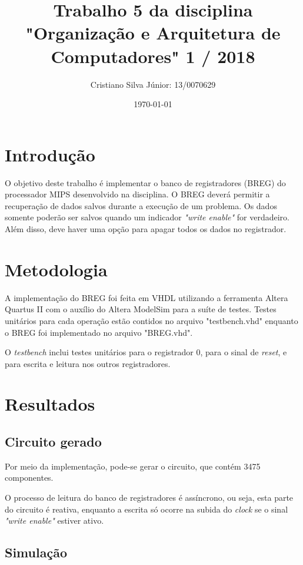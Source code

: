 \documentclass[12pt, a4paper, twoside]{article}
\begin{document}
\title{Trabalho 5 da disciplina "Organização e Arquitetura de Computadores" 1 /
2018}
\author{Cristiano Silva Júnior: 13/0070629}
\date{\today}
\maketitle

\section{Introdução}

O objetivo deste trabalho é implementar o banco de registradores (BREG) do
processador MIPS desenvolvido na disciplina. O BREG deverá permitir a
recuperação de dados salvos durante a execução de um problema. Os dados somente
poderão ser salvos quando um indicador \textit{"write enable"} for verdadeiro.
Além disso, deve haver uma opção para apagar todos os dados no registrador.

\section{Metodologia}

A implementação do BREG foi feita em VHDL utilizando a ferramenta Altera Quartus
II com o auxílio do Altera ModelSim para a suíte de testes. Testes unitários
para cada operação estão contidos no arquivo "testbench.vhd" enquanto o BREG
foi implementado no arquivo "BREG.vhd".

O \textit{testbench} inclui testes unitários para o registrador 0, para o sinal
de \textit{reset}, e para escrita e leitura nos outros registradores.

\section{Resultados}

\subsection{Circuito gerado}

Por meio da implementação, pode-se gerar o circuito, que contém 3475
componentes.

O processo de leitura do banco de registradores é assíncrono, ou seja, esta
parte do circuito é reativa, enquanto a escrita só ocorre na subida do
\textit{clock} se o sinal \textit{"write enable"} estiver ativo.

\subsection{Simulação}
\end{document}
